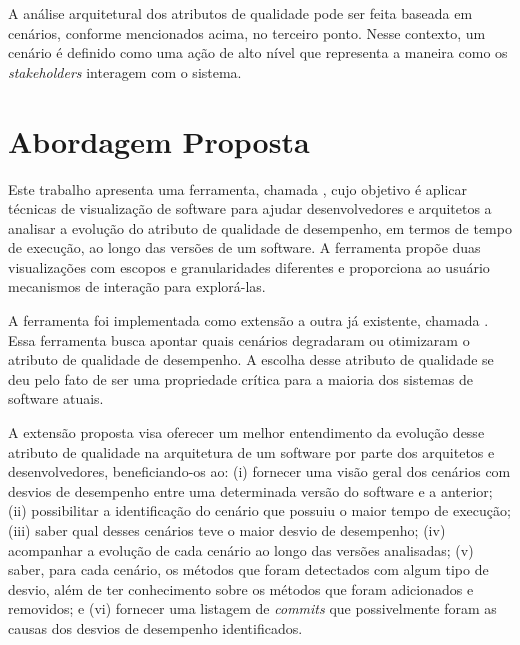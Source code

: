 A análise arquitetural dos atributos de qualidade pode ser feita baseada em cenários, conforme mencionados acima, no terceiro ponto. Nesse contexto, um cenário é definido como uma ação de alto nível que representa a maneira como os \textit{stakeholders} interagem com o sistema.

\section{Abordagem Proposta} \label{sec:abordagem-proposta}

Este trabalho apresenta uma ferramenta, chamada \textit{\toolName}, cujo objetivo é aplicar técnicas de visualização de software para ajudar desenvolvedores e arquitetos a analisar a evolução do atributo de qualidade de desempenho, em termos de tempo de execução, ao longo das versões de um software. A ferramenta propõe duas visualizações com escopos e granularidades diferentes e proporciona ao usuário mecanismos de interação para explorá-las.


A ferramenta foi implementada como extensão a outra já existente, chamada \textit{\perfMinerName} \cite{Pinto2015}. Essa ferramenta busca apontar quais cenários degradaram ou otimizaram o atributo de qualidade de desempenho. A escolha desse atributo de qualidade se deu pelo fato de ser uma propriedade crítica para a maioria dos sistemas de software atuais.

A extensão proposta visa oferecer um melhor entendimento da evolução desse atributo de qualidade na arquitetura de um software por parte dos arquitetos e desenvolvedores, beneficiando-os ao: (i) fornecer uma visão geral dos cenários com desvios de desempenho entre uma determinada versão do software e a anterior; (ii) possibilitar a identificação do cenário que possuiu o maior tempo de execução; (iii) saber qual desses cenários teve o maior desvio de desempenho; (iv) acompanhar a evolução de cada cenário ao longo das versões analisadas; (v) saber, para cada cenário, os métodos que foram detectados com algum tipo de desvio, além de ter conhecimento sobre os métodos que foram adicionados e removidos; e (vi) fornecer uma listagem de \textit{commits} que possivelmente foram as causas dos desvios de desempenho identificados.

